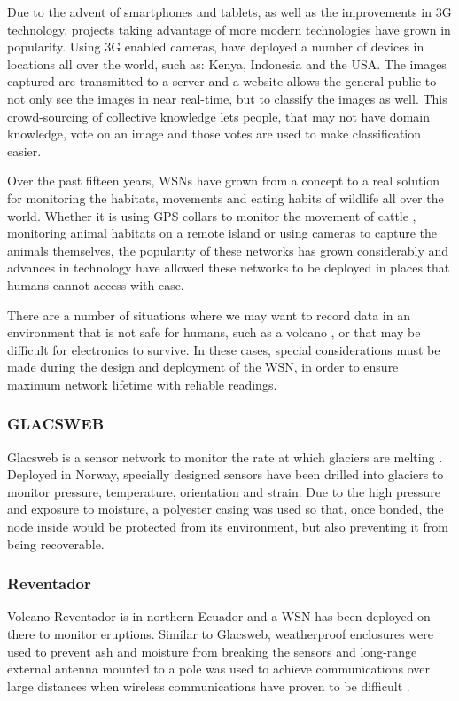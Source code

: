 	Due to the advent of smartphones and tablets, as well as the improvements in 3G technology, projects taking advantage of more modern technologies have grown in popularity. Using 3G enabled cameras, \cite{ZSL} have deployed a number of devices in locations all over the world, such as: Kenya, Indonesia and the USA. The images captured are transmitted to a server and a website allows the general public to not only see the images in near real-time, but to classify the images as well. This crowd-sourcing of collective knowledge lets people, that may not have domain knowledge, vote on an image and those votes are used to make classification easier.

	Over the past fifteen years, WSNs have grown from a concept to a real solution for monitoring the habitats, movements and eating habits of wildlife all over the world. Whether it is using GPS collars to monitor the movement of cattle \cite{Guo2006}, monitoring animal habitats on a remote island or using cameras to capture the animals themselves, the popularity of these networks has grown considerably and advances in technology have allowed these networks to be deployed in places that humans cannot access with ease.
	
		There are a number of situations where we may want to record data in an environment that is not safe for humans, such as a volcano \cite{Werner-Allen2006}, or that may be difficult for electronics to survive. In these cases, special considerations must be made during the design and deployment of the WSN, in order to ensure maximum  network lifetime with reliable readings.
	\subsubsection{GLACSWEB}
	Glacsweb is a sensor network to monitor the rate at which glaciers are melting \cite{Martinez2004}. Deployed in Norway, specially designed sensors have been drilled into glaciers to monitor pressure, temperature, orientation and strain. Due to the high pressure and exposure to moisture, a polyester casing was used so that, once bonded, the node inside would be protected from its environment, but also preventing it from being recoverable.
	\subsubsection{Reventador}
	Volcano Reventador is in northern Ecuador and a WSN has been deployed on there to monitor eruptions. Similar to Glacsweb, weatherproof enclosures were used to prevent ash and moisture from breaking the sensors and long-range external antenna mounted to a pole was used to achieve communications over large distances when wireless communications have proven to be difficult \cite{Werner-Allen2006}.
